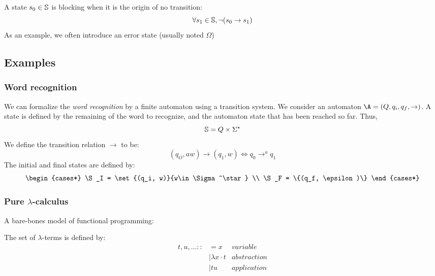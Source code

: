 \documentclass[toc]{../cs-classes/cs-classes}
\begin{document}
\begin{definition}
    A state $s_0\in\S$ is blocking when it is the origin of no transition:
    \begin{equation*}
        \forall s_1\in\S, \lnot(s_0\to s_1)
    \end{equation*}
    As an example, we often introduce an error state (usually noted $\Omega$)
\end{definition}

\subsection{Examples}
\subsubsection{Word recognition}
We can formalize the \emph{word recognition} by a finite automaton using a transition system. We consider an automaton $\A=(Q, q_i, q_f, \to)$. A state is defined by the remaining of the word to recognize, and the automaton state that has been reached so far. Thus,
\begin{equation*}
    \S = Q\times \Sigma^\star
\end{equation*}
We define the transition relation $\to$ to be:
\begin{equation*}
    (q_O, aw)\to(q_1, w) \iff q_0 \to^a q_1
\end{equation*}
The initial and final states are defined by:
\begin{equation*}
    \begin{cases*}
        \S_I = \set{(q_i, w)}{w\in\Sigma^\star} \\
        \S_F = \{(q_f, \epsilon)\}
    \end{cases*}
\end{equation*}

\subsubsection{Pure \texorpdfstring{$\lambda$}{ Ⲗ}-calculus}
A bare-bones model of functional programming:
\begin{definition}
    The set of $\lambda$-terms is defined by:
        \begin{align*}
            t, u, \dots ::&= x & variable\\
            &| \lambda x\cdot t & abstraction\\
            &| tu & application
        \end{align*}
\end{definition}
\end{document}
